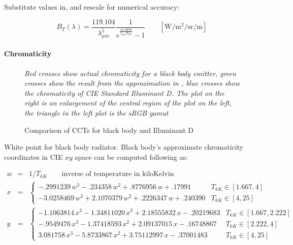 Substitute values in, and rescale for numerical accuracy:

\begin{equation}
B_T(\lambda) = \frac{119.104}{\lambda_{\mu m}^5} \frac
1{e^{\frac{14.3878}{\lambda_{\mu m} T_{kK}}}-1}
\qquad \left[\si{\watt\per\square\meter\per\steradian\per\meter}\right]
\end{equation}

\paragraph{Chromaticity}

\begin{figure}
{
\centering
\begin{minipage}{.4\textwidth}

\end{minipage}
\begin{minipage}{.4\textwidth}

\end{minipage}

\caption{Comparison of CCTs for black body and Illuminant D}
\label{fig:blackbodychroma}
}
\vskip 1mm
{\footnotesize\it Red crosses show actual chromaticity for a black body
emitter, green crosses show the result from the approximation in
\cite{kang02}, blue crosses show the chromaticity of CIE Standard
Illuminant D. The plot on the right is an enlargement of the
central region of the plot on the left, the triangle in the left plot
is the sRGB gamut}
\end{figure}

White point for black body radiator. Black body's approximate chromaticity
coordinates in CIE $xy$ space can be computed following \cite{kang02} as:

\begin{equation}
\begin{array}{rcll}
w & = & 1/T_{kK} \qquad \text{inverse of temperature in kiloKelvin} & \\
x & = & \begin{cases}
     - .2991239\,w^3 -  .234358 \,w^2  +  .8776956\,w  + .17991  & T_{kK} \in [1.667, 4] \\
     -3.0258469\,w^3 + 2.1070379\,w^2  +  .2226347\,w  + .240390 & T_{kK} \in [4, 25]
    \end{cases} \\
y & = & \begin{cases}
     -1.1063814\,x^3 - 1.34811020\,x^2 + 2.18555832\,x - .20219683 & T_{kK} \in [1.667, 2.222] \\
     - .9549476\,x^3 - 1.37418593\,x^2 + 2.09137015\,x - .16748867 & T_{kK} \in [2.222, 4] \\
      3.081758 \,x^3 - 5.8733867 \,x^2 + 3.75112997\,x - .37001483 & T_{kK} \in [4, 25]
      \end{cases}
\end{array}
\end{equation}

